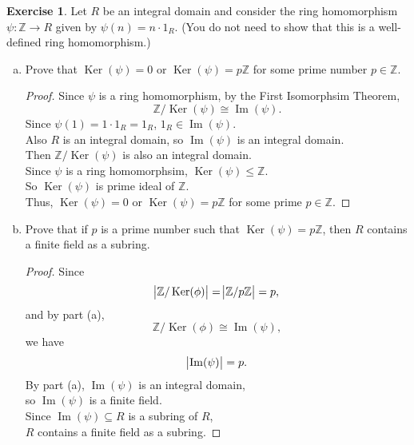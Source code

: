 \documentclass{article}
\newcommand{\bbz}{\mathbb{Z}}
\renewcommand{\ker}{\operatorname{Ker}}
\newcommand{\im}{\operatorname{Im}}
\theoremstyle{plain}
\theoremstyle{definition}
\newtheorem{exer}[lem]{Exercise}
\begin{document}
\begin{exer}
Let $R$ be an integral domain and consider the ring homomorphism $\psi\colon\bbz\to R$ given by $\psi(n)=n\cdot 1_R$.
(You do not need to show that this is a well-defined ring homomorphism.)
\begin{enumerate}[(a)]
\item Prove that $\ker(\psi)=0$ or $\ker(\psi)=p\bbz$ for some prime number $p\in\bbz$.
    \begin{proof}
        Since $\psi$ is a ring homomorphism, by the First Isomorphsim Theorem,  
        \[\bbz / \ker(\psi) \cong \im(\psi).\]
        Since $\psi(1) = 1\cdot 1_R = 1_R$, $1_R \in \im(\psi)$.\\
        Also $R$ is an integral domain, so $\im(\psi)$ is an integral domain.\\
        Then $\bbz / \ker(\psi)$ is also an integral domain.\\
        Since $\psi$ is a ring homomorphsim, $\ker(\psi) \leq \bbz$.\\
        So $\ker(\psi)$ is prime ideal of $\bbz$.\\
        Thus, $\ker(\psi) = 0$ or $\ker(\psi) = p \bbz$ for some prime $p \in \bbz$.
\end{proof}
\item 
    Prove that if $p$ is a prime number such that $\ker(\psi)=p\bbz$, then $R$ contains a finite field as a subring.
    \begin{proof}
    Since 
    \[\abs{\bbz / \ker(\phi)} = \abs{\bbz / p\bbz} =  p,\]
    and by part (a),
    \[\bbz / \ker(\phi) \cong \im(\psi),\]
    we have
    \[\abs{\im(\psi)} = p.\]
    By part (a), $\im(\psi)$ is an integral domain,\\
    so $\im(\psi)$ is a finite field.\\
    Since $\im(\psi) \subseteq R$ is a subring of $R$,\\
    $R$ contains a finite field as a subring.
    \end{proof}


\end{enumerate}
\end{exer}
\end{document}
